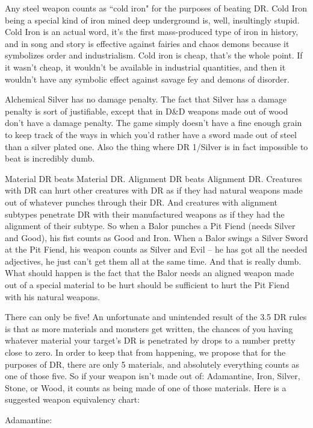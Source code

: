 \listone
\item Any steel weapon counts as ``cold iron" for the purposes of beating DR. Cold Iron being a special kind of iron mined deep underground is, well, insultingly stupid. Cold Iron is an actual word, it's the first mass-produced type of iron in history, and in song and story is effective against fairies and chaos demons because it symbolizes order and industrialism. Cold iron is cheap, that's the whole point. If it wasn't cheap, it wouldn't be available in industrial quantities, and then it wouldn't have any symbolic effect against savage fey and demons of disorder.
\item Alchemical Silver has no damage penalty. The fact that Silver has a damage penalty is sort of justifiable, except that in D\&D weapons made out of wood don't have a damage penalty. The game simply doesn't have a fine enough grain to keep track of the ways in which you'd rather have a sword made out of steel than a silver plated one. Also the thing where DR 1/Silver is in fact impossible to beat is incredibly dumb.
\item Material DR beats Material DR. Alignment DR beats Alignment DR. Creatures with DR can hurt other creatures with DR as if they had natural weapons made out of whatever punches through their DR. And creatures with alignment subtypes penetrate DR with their manufactured weapons as if they had the alignment of their subtype. So when a Balor punches a Pit Fiend (needs Silver and Good), his fist counts as Good and Iron. When a Balor swings a Silver Sword at the Pit Fiend, his weapon counts as Silver and Evil -- he has got all the needed adjectives, he just can't get them all at the same time. And that is really dumb. What should happen is the fact that the Balor needs an aligned weapon made out of a special material to be hurt should be sufficient to hurt the Pit Fiend with his natural weapons.
\item There can only be five! An unfortunate and unintended result of the 3.5 DR rules is that as more materials and monsters get written, the chances of you having whatever material your target's DR is penetrated by drops to a number pretty close to zero. In order to keep that from happening, we propose that for the purposes of DR, there are only 5 materials, and absolutely everything counts as one of those five. So if your weapon isn't made out of: Adamantine, Iron, Silver, Stone, or Wood, it counts as being made of one of those materials. Here is a suggested weapon equivalency chart:
\listtwo
    \item Adamantine: \listthree\small
